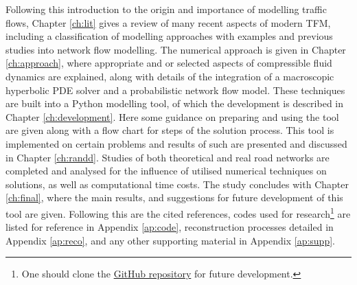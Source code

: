 	Following this introduction to the origin and importance of modelling traffic flows, Chapter \ref{ch:lit} gives a review of many recent aspects of modern TFM, including a classification of modelling approaches with examples and previous studies into network flow modelling. The numerical approach is given in Chapter \ref{ch:approach}, where appropriate and or selected aspects of compressible fluid dynamics are explained, along with details of the integration of a macroscopic hyperbolic PDE solver and a probabilistic network flow model. These techniques are built into a Python modelling tool, of which the development is described in Chapter \ref{ch:development}. Here some guidance on preparing and using the tool are given along with a flow chart for steps of the solution process. This tool is implemented on certain problems and results of such are presented and discussed in Chapter \ref{ch:randd}. Studies of both theoretical and real road networks are completed and analysed for the influence of utilised numerical techniques on solutions, as well as computational time costs. The study concludes with Chapter \ref{ch:final}, where the main results, and suggestions for future development of this tool are given. Following this are the cited references, codes used for research\footnote{One should clone the \href{https://github.com/adj97/TFM_Thesis}{GitHub repository} for future development.} are listed for reference in Appendix \ref{ap:code}, reconstruction processes detailed in Appendix \ref{ap:reco}, and any other supporting material in Appendix \ref{ap:supp}.